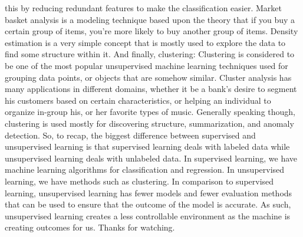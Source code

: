 this by reducing redundant features to make the classification easier. Market basket analysis is a modeling technique based upon the theory that if you buy a certain group of items, you're more likely to buy another group of items. Density estimation is a very simple concept that is mostly used to explore the data to find some structure within it. And finally, clustering: Clustering is considered to be one of the most popular unsupervised machine learning techniques used for grouping data points, or objects that are somehow similar. Cluster analysis has many applications in different domains, whether it be a bank's desire to segment his customers based on certain characteristics, or helping an individual to organize in-group his, or her favorite types of music. Generally speaking though, clustering is used mostly for discovering structure, summarization, and anomaly detection. So, to recap, the biggest difference between supervised and unsupervised learning is that supervised learning deals with labeled data while unsupervised learning deals with unlabeled data. In supervised learning, we have machine learning algorithms for classification and regression. In unsupervised learning, we have methods such as clustering. In comparison to supervised learning, unsupervised learning has fewer models and fewer evaluation methods that can be used to ensure that the outcome of the model is accurate. As such, unsupervised learning creates a less controllable environment as the machine is creating outcomes for us. Thanks for watching.